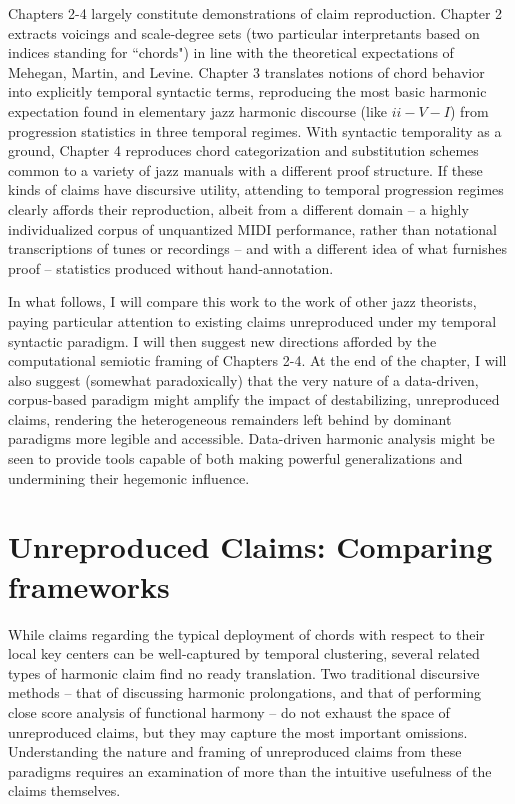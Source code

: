 Chapters 2-4 largely constitute demonstrations of claim reproduction.  Chapter 2 extracts voicings and scale-degree sets (two particular interpretants based on indices standing for ``chords") in line with the theoretical expectations of Mehegan, Martin, and Levine.  Chapter 3 translates notions of chord behavior into explicitly temporal syntactic terms, reproducing the most basic harmonic expectation found in elementary jazz harmonic discourse (like $ii - V - I$) from progression statistics in three temporal regimes.  With syntactic temporality as a ground, Chapter 4 reproduces chord categorization and substitution schemes common to a variety of jazz manuals with a different proof structure.  If these kinds of claims have discursive utility, attending to temporal progression regimes clearly affords their reproduction, albeit from a different domain -- a highly individualized corpus of unquantized MIDI performance, rather than notational transcriptions of tunes or recordings -- and with a different idea of what furnishes proof -- statistics produced without hand-annotation.

In what follows, I will compare this work to the work of other jazz theorists, paying particular attention to existing claims unreproduced under my temporal syntactic paradigm.  I will then suggest new directions afforded by the computational semiotic framing of Chapters 2-4.  At the end of the chapter, I will also suggest (somewhat paradoxically) that the very nature of a data-driven, corpus-based paradigm might amplify the impact of destabilizing, unreproduced claims, rendering the heterogeneous remainders left behind by dominant paradigms more legible and accessible.  Data-driven harmonic analysis might be seen to provide tools capable of both making powerful generalizations and undermining their hegemonic influence.

\section{Unreproduced Claims: Comparing frameworks}

While claims regarding the typical deployment of chords with respect to their local key centers can be well-captured by temporal clustering, several related types of harmonic claim find no ready translation.  Two traditional discursive methods -- that of discussing harmonic prolongations, and that of performing close score analysis of functional harmony -- do not exhaust the space of unreproduced claims, but they may capture the most important omissions.  Understanding the nature and framing of unreproduced claims from these paradigms requires an examination of more than the intuitive usefulness of the claims themselves.

